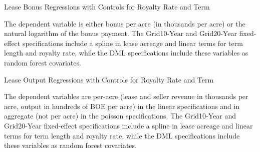 \documentclass[12pt]{article}
\begin{document}
\begin{appendices}
\addtolength{\tabcolsep}{-10pt}
\begin{table}[H]
	\begin{center}
	\begin{threeparttable}
	\caption{Lease Bonus Regressions with Controls for Royalty Rate and Term}
	\label{tab:BonusWithRoyaltyTerm}
	\small
	            
		\begin{tablenotes}
		\footnotesize
		\item The dependent variable is either bonus per acre (in thousands per acre) or the natural logarithm of the bonus payment.  The Grid10-Year and Grid20-Year fixed-effect specifications include a spline in lease acreage and linear terms for term length and royalty rate, while the DML specifications include these variables as  random forest covariates.     
		\end{tablenotes}	   
	\end{threeparttable}
	\end{center}
\end{table}

\begin{table}[H]
	\begin{center}
	\begin{threeparttable}
	\caption{Lease Output Regressions with Controls for Royalty Rate and Term}
	\label{tab:OutputWithRoyaltyTerm}
	\small
	            
		\begin{tablenotes}
		\footnotesize
		\item The dependent variables are per-acre (lease and seller revenue in thousands per acre, output in hundreds of BOE per acre) in the linear specifications and in aggregate (not per acre) in the poisson specifications.  The Grid10-Year and Grid20-Year fixed-effect specifications include a spline in lease acreage and linear terms for term length and royalty rate, while the DML specifications include these variables as  random forest covariates.    
		\end{tablenotes}	   
	\end{threeparttable}
	\end{center}
\end{table}

\addtolength{\tabcolsep}{-6pt}


\end{appendices}
\end{document}
